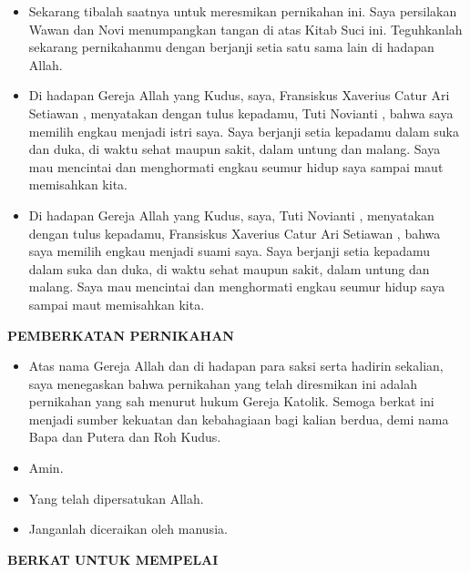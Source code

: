 \documentclass[10pt]{book}
\makeatletter
\newcommand{\subjudul}[1]{%
  {\parindent \z@ \normalfont
    \interlinepenalty\@M \bfseries #1\par\nobreak \vskip 20\p@ }}
\newcommand{\BU}[1]{\begin{itemize} \item[U:] #1 \end{itemize}}
\newcommand{\BI}[1]{\begin{itemize} \item[I:] #1 \end{itemize}}
\newcommand{\BL}[1]{\begin{itemize} \item[Wawan:] #1 \end{itemize}}
\newcommand{\BW}[1]{\begin{itemize} \item[Novi:] #1 \end{itemize}}
\newcommand{\mempelaip}{Fransiskus Xaverius Catur Ari Setiawan }
\newcommand{\mempelaiw}{Tuti Novianti }
\makeatother
\begin{document}
\BI{Sekarang tibalah saatnya untuk meresmikan pernikahan ini.  Saya persilakan Wawan dan Novi menumpangkan tangan di atas Kitab Suci ini. Teguhkanlah sekarang pernikahanmu dengan berjanji setia satu sama lain di hadapan Allah.}

\BL{Di hadapan Gereja Allah yang Kudus, saya, \mempelaip, menyatakan dengan tulus kepadamu, \mempelaiw, bahwa saya memilih engkau menjadi istri saya. Saya berjanji setia kepadamu dalam suka dan duka, di waktu sehat maupun sakit, dalam untung dan malang. Saya mau mencintai dan menghormati engkau seumur hidup saya sampai maut memisahkan kita.}

\BW{Di hadapan Gereja Allah yang Kudus, saya, \mempelaiw, menyatakan dengan tulus kepadamu, \mempelaip, bahwa saya memilih engkau menjadi suami saya. Saya berjanji setia kepadamu dalam suka dan duka, di waktu sehat maupun sakit, dalam untung dan malang. Saya mau mencintai dan menghormati engkau seumur hidup saya sampai maut memisahkan kita.}


\subjudul{PEMBERKATAN PERNIKAHAN}

\BI{Atas nama Gereja Allah dan di hadapan para saksi serta hadirin sekalian, saya menegaskan bahwa pernikahan yang telah diresmikan ini adalah pernikahan yang sah menurut hukum Gereja Katolik. Semoga berkat ini menjadi sumber kekuatan dan kebahagiaan bagi kalian berdua, demi nama Bapa dan Putera dan Roh Kudus.}

\BU{Amin.}

\BI{Yang telah dipersatukan Allah.}

\BU{Janganlah diceraikan oleh manusia.}


\subjudul{BERKAT UNTUK MEMPELAI}
\end{document}
